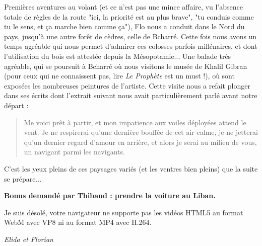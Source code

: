 Premières aventures au volant (et ce n'est pas une mince affaire, vu
l'absence totale de règles de la route "ici, la priorité est au plus
brave", "tu conduis comme tu le sens, et ça marche bien comme ça"), Flo
nous a conduit dans le Nord du pays, jusqu'à une autre forêt de cèdres,
celle de Bcharré. Cette fois nous avons un temps agréable qui nous
permet d'admirer ces colosses parfois millénaires, et dont l'utilisation
du bois est attestée depuis la Mésopotamie... Une balade très agréable,
qui se poursuit à Bcharré où nous visitons le musée de Khalil Gibran
(pour ceux qui ne connaissent pas, lire \emph{Le Prophète} est un must
!), où sont exposées les nombreuses peintures de l'artiste. Cette visite
nous a refait plonger dans ses écrits dont l'extrait suivant nous avait
particulièrement parlé avant notre départ :

\begin{quote}
Me voici prêt à partir, et mon impatience aux voiles déployées attend le
vent. Je ne respirerai qu'une dernière bouffée de cet air calme, je ne
jetterai qu'un dernier regard d'amour en arrière, et alors je serai au
milieu de vous, un navigant parmi les navigants.
\end{quote}

C'est les yeux pleins de ces paysages variés (et les ventres bien
pleins) que la suite se prépare...

\textbf{Bonus demandé par Thibaud : prendre la voiture au Liban.}

Je suis désolé, votre navigateur ne supporte pas les vidéos HTML5 au
format WebM avec VP8 ni au format MP4 avec H.264.

\emph{Elida et Florian}
